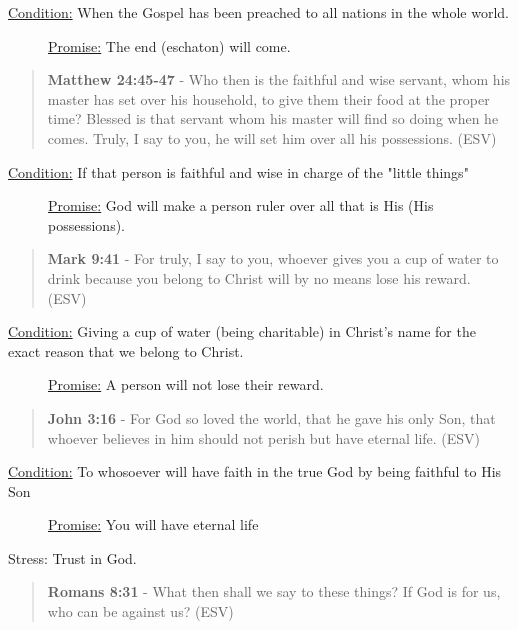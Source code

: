 \documentclass[11pt]{article}
\begin{document}
\begin{description}
\item[{\uline{Condition:} When the Gospel has been preached to all nations in the whole world.}] \uline{Promise:} The end (eschaton) will come.
\end{description}

\begin{quote}
\textbf{Matthew 24:45-47} - Who then is the faithful and wise servant, whom his master has set over his household, to give them their food at the proper time? Blessed is that servant whom his master will find so doing when he comes. Truly, I say to you, he will set him over all his possessions. (ESV)
\end{quote}

\begin{description}
\item[{\uline{Condition:} If that person is faithful and wise in charge of the "little things"}] \uline{Promise:} God will make a person ruler over all that is His (His possessions).
\end{description}

\begin{quote}
\textbf{Mark 9:41} - For truly, I say to you, whoever gives you a cup of water to drink because you belong to Christ will by no means lose his reward. (ESV)
\end{quote}

\begin{description}
\item[{\uline{Condition:} Giving a cup of water (being charitable) in Christ's name for the exact reason that we belong to Christ.}] \uline{Promise:} A person will not lose their reward.
\end{description}

\begin{quote}
\textbf{John 3:16} - For God so loved the world, that he gave his only Son, that whoever believes in him should not perish but have eternal life. (ESV)
\end{quote}

\begin{description}
\item[{\uline{Condition:} To whosoever will have faith in the true God by being faithful to His Son}] \uline{Promise:} You will have eternal life
\end{description}

Stress: Trust in God.

\begin{quote}
\textbf{Romans 8:31} - What then shall we say to these things? If God is for us, who can be against us? (ESV)
\end{quote}
\end{document}
